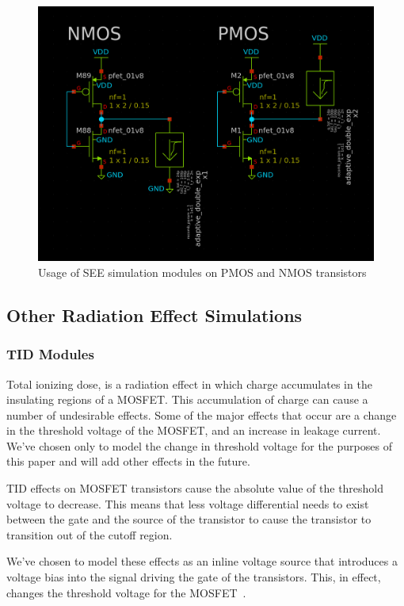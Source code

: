 \documentclass[conference]{IEEEtran}
\begin{document}
    \begin{figure}[htbp]
        \centering
        \includegraphics[width=0.9\linewidth]{PMOS_NMOS_Usage}
        \caption{Usage of SEE simulation modules on PMOS and NMOS transistors}
        \label{fig:SEE_Usage}
    \end{figure}

    \subsection{Other Radiation Effect Simulations}
    \label{subsec:other-radiation-effect-simulations}

    \subsubsection{TID Modules}
    Total ionizing dose, is a radiation effect in which charge accumulates in the insulating regions of a MOSFET. This accumulation of charge can cause a number of undesirable effects.
    Some of the major effects that occur are a change in the threshold voltage of the MOSFET, and an increase in leakage current.
    We've chosen only to model the change in threshold voltage for the purposes of this paper and will add other effects in the future.

    TID effects on MOSFET transistors cause the absolute value of the threshold voltage to decrease.
    This means that less voltage differential needs to exist between the gate and the source of the transistor to cause the transistor to transition out of the cutoff region.

    We've chosen to model these effects as an inline voltage source that introduces a voltage bias into the signal driving the gate of the transistors.
    This, in effect, changes the threshold voltage for the MOSFET~\cite{Oldham2003TotalID, electronics13061073, 9691344}.
\end{document}
